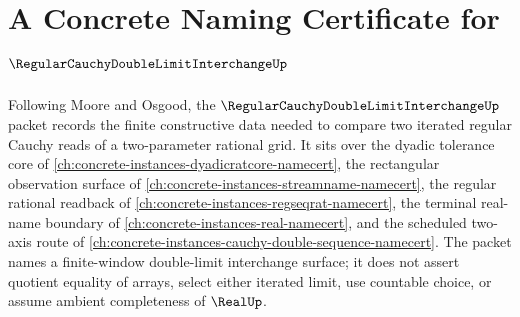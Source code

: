 \chapter{A Concrete Naming Certificate for $\RegularCauchyDoubleLimitInterchangeUp$}
\label{ch:concrete-instances-regular-cauchy-double-limit-interchange-namecert}

Following Moore and Osgood, the $\RegularCauchyDoubleLimitInterchangeUp$ packet records the finite constructive data needed to compare two iterated regular Cauchy reads of a two-parameter rational grid. It sits over the dyadic tolerance core of \autoref{ch:concrete-instances-dyadicratcore-namecert}, the rectangular observation surface of \autoref{ch:concrete-instances-streamname-namecert}, the regular rational readback of \autoref{ch:concrete-instances-regseqrat-namecert}, the terminal real-name boundary of \autoref{ch:concrete-instances-real-namecert}, and the scheduled two-axis route of \autoref{ch:concrete-instances-cauchy-double-sequence-namecert}. The packet names a finite-window double-limit interchange surface; it does not assert quotient equality of arrays, select either iterated limit, use countable choice, or assume ambient completeness of $\RealUp$.

